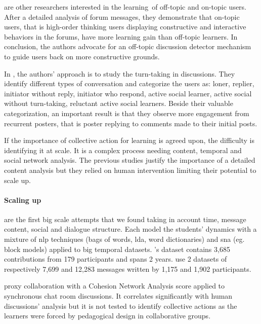 \documentclass[a4paper,twoside]{article}
\begin{document}
\cite{Wang2016} are other researchers interested in the learning~of off-topic and on-topic users.  After a detailed analysis of forum messages, they demonstrate that on-topic users, that is high-order thinking users displaying constructive and interactive behaviors in the forums, have more learning gain than off-topic learners.  In conclusion, the authors advocate for an off-topic discussion detector mechanism to guide users back on more constructive grounds.

In \citep{Chua2017}, the authors' approach is to study the turn-taking in discussions.  They identify different types of conversation and categorize the users as: loner, replier, initiator without reply, initiator who respond, active social learner, active social without turn-taking, reluctant active social learners.  Beside their valuable categorization, an important result is that they observe more engagement from recurrent posters, that is poster replying to comments made to their initial posts.

If the importance of collective action for learning is agreed upon, the difficulty is identifying it at scale.  It is a complex process needing content, temporal and social network analysis.  The previous studies justify the importance of a detailed content analysis but they relied on human intervention limiting their potential to scale up.

\paragraph{Scaling up}

\cite{Dascalu2017,Boroujeni2017} are the first big scale attempts that we found taking in account time, message content, social and dialogue structure.  Each model the students' dynamics with a mixture of \gls{nlp} techniques (bags of words, \gls{lda}, word dictionaries) and \gls{sna} (eg. block models) applied to big temporal datasets.  \cite{Dascalu2017}'s dataset contains  3,685 contributions from 179 participants and spans 2 years.  \cite{Boroujeni2017} use 2 datasets of respectively 7,699 and 12,283 messages written by 1,175 and 1,902 participants.

\cite{Dascalu2017} proxy collaboration with a Cohesion Network Analysis score applied to synchronous chat room discussions.  It correlates significantly with human discussions' analysis but it is not tested to identify collective actions as the learners were forced by pedagogical design in collaborative groups.
\end{document}

